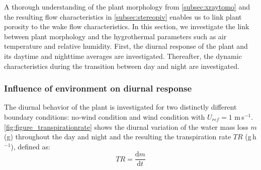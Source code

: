 A thorough understanding of the plant morphology from \cref{subsec:xraytomo} and the resulting flow characteristics in \cref{subsec:stereopiv} enables us to link plant porosity to the wake flow characteristics. In this section, we investigate the link between plant morphology and the hygrothermal parameters such as air temperature and relative humidity. First, the diurnal response of the plant and its daytime and nighttime averages are investigated. Thereafter, the dynamic characteristics during the transition between day and night are investigated. 

\subsubsection*{Influence of environment on diurnal response}

The diurnal behavior of the plant is investigated for two distinctly different boundary conditions: no-wind condition and wind condition with $U_{ref}=1$ m\,s$^{-1}$. \cref{fig:figure_transpirationrate} shows the diurnal variation of the water mass loss $m$ (g) throughout the day and night and the resulting the transpiration rate $TR$ (g\,h$^{-1}$), defined as:
\begin{equation}
TR = \frac{\mathrm{d}m}{\mathrm{d}t}
\end{equation}
